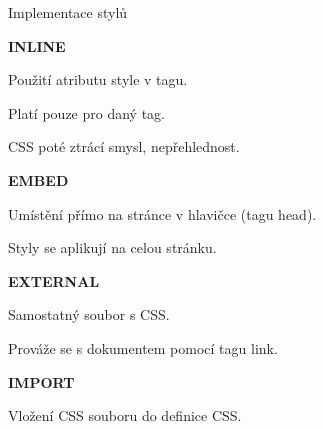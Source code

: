 \documentclass[aspectratio=1610]{beamer}
\begin{document}
\begin{frame}{Implementace stylů}
    \begin{multicols}{2}
        \centering

        \begin{cardTiny}
            \begin{center}
                \textbf{INLINE}
            \end{center}

            \begin{flushleft}
                Použití atributu style v tagu.

                Platí pouze pro daný tag. 

                CSS poté ztrácí smysl, nepřehlednost.
            \end{flushleft}
        \end{cardTiny}
        \begin{cardTiny}
            \begin{center}
                \textbf{EMBED}
            \end{center}
        
            \begin{flushleft}
                Umístění přímo na stránce v hlavičce (tagu head).

                Styly se aplikují na celou stránku.
            \end{flushleft}
        \end{cardTiny}
        \begin{cardTiny}
            \begin{center}
                \textbf{EXTERNAL}
            \end{center}
        
            \begin{flushleft}
                Samostatný soubor s CSS.

                Prováže se s dokumentem pomocí tagu link.
            \end{flushleft}
        \end{cardTiny}
        \begin{cardTiny}
            \begin{center}
                \textbf{IMPORT}
            \end{center}
        
            \begin{flushleft}
                Vložení CSS souboru do definice CSS.
            \end{flushleft}
        \end{cardTiny}
    \end{multicols}
\end{frame}
\end{document}
